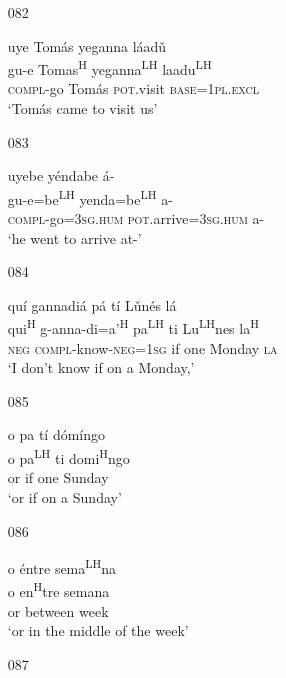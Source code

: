 \begin{itemize}
\item[082]
 
\glll   uye Tom\'{a}s yeganna l\'{a}ad\v{u}\\
gu-e Tomas\textsuperscript{H} yeganna\textsuperscript{LH} laadu\textsuperscript{LH}\\
\textsc{compl}-go Tom\'{a}s \textsc{pot}.visit \textsc{base}=\textsc{1pl.excl}\\
\glt `Tom\'{a}s came to visit us'
 


\item[083]
 
\glll   uyebe y\'{e}ndabe \'{a}- \\
 gu-e=be\textsuperscript{LH} yenda=be\textsuperscript{LH} a- \\
\textsc{compl}-go=\textsc{3sg.hum} \textsc{pot}.arrive=\textsc{3sg.hum} a-\\
\glt `he went to arrive at-'
 


\item[084]
 
\glll   qu\'{i} gannadi\'{a} p\'{a} t\'{i} L\v{u}n\'{e}s l\'{a}\\
qui\textsuperscript{H} g-anna-di=a'\textsuperscript{H} pa\textsuperscript{LH} ti Lu\textsuperscript{LH}nes la\textsuperscript{H}\\
\textsc{neg} \textsc{compl}-know-\textsc{neg}=\textsc{1sg} if one Monday \textsc{la}\\
\glt `I don't know if on a Monday,'
 


\item[085]
 
\glll   o pa t\'{i} d\'{o}m\'{i}ngo\\
o pa\textsuperscript{LH} ti domi\textsuperscript{H}ngo \\
or if one Sunday\\
\glt `or if on a Sunday' 
 


\item[086]
 
\glll   o \'{e}ntre sema\textsuperscript{LH}na\\
o en\textsuperscript{H}tre semana\\
or between week\\
\glt `or in the middle of the week'
 


\item[087]
 

\end{itemize}
